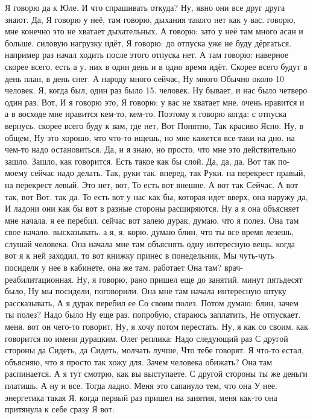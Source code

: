 Я говорю да к Юле.
И что спрашивать откуда?
Ну, явно они все друг друга знают.
Да, Я говорю у неё, там говорю, дыхания такого нет как у вас. говорю, мне конечно это не хватает дыхательных.
А говорю: зато у неё там много асан и больше.
силовую нагрузку идёт, Я говорю: до отпуска уже не буду дёргаться.
например раз начал ходить после этого отпуска нет. А там говорю: наверное скорее всего.
есть а у.
них в один день и в одно время идёт.
Скорее всего будут в день план, в день снег. А народу много сейчас, Ну много Обычно около 10 человек.
Я, когда был, один раз было 15.
человек. Ну бывает, и нас было четверо один раз. Вот, И я говорю это, Я говорю: у вас не хватает мне.
очень нравится и
а в восходе мне нравится кем-то, кем-то. Поэтому я говорю когда:
с отпуска вернусь.
скорее всего буду к вам, где нет, Вот Понятно, Так красиво Ясно. Ну, в общем,
Ну это хорошо, что что-то ищешь, но мне кажется все-таки на дно. на чем-то надо остановиться.
Да, и я знаю, но просто, что мне это действительно зашло.
Зашло, как говорится.
Есть такое как бы слой.
Да, да, да.
Вот так по-моему сейчас надо делать.
Так, руки так.
вперед, так Руки.
на перекрест правый, на перекрест левый. Это нет, вот, То есть вот внешне. А вот так Сейчас.
А вот так, вот Вот.
так да. То есть вот у нас как бы, которая идет вверх, она наружу да, И ладони они как бы вот в разные стороны расширяются.
Ну а я она объясняет мне начала. я ее перебил. сейчас вот залею дурак, думаю, что я полез. Она там свое начало.
высказывать. а я, я.
корю. думаю блин, что ты все время лезешь, слушай человека. Она начала мне там объяснять одну интересную вещь. когда вот я к ней заходил, то вот книжку принес в понедельник, Мы чуть-чуть посидели у нее в кабинете, она же там.
работает Она там?
врач-реабилитационная. Ну, я говорю, рано пришел еще до занятий.
минут пятьдесят было, Ну мы
посидели, поговорили. Она мне там начала интересную штуку рассказывать, А я дурак перебил ее Со своим полез. Потом думаю: блин, зачем ты полез? Надо было Ну еще раз.
попробую, стараюсь заплатить, Не отпускает.
меня. вот он чего-то говорит, Ну, я хочу потом перестать. Ну, я как со своим.
как говорится по имени дурацким.
Олег реплика: Надо следующий раз С другой стороны да Сидеть, да Сидеть, молчать лучше, Что тебе говорят. Я что-то естал, объясняю, что я просто так хожу для.
Зачем человека обижать? Она там распинается.
А я тут смотрю, как вы выступаете. С другой стороны ты же деньги платишь. А ну и все. Тогда ладно. Меня это сапануло тем, что она У нее.
энергетика такая Я. когда первый раз пришел на занятия, меня как-то она притянула к себе сразу Я вот:
